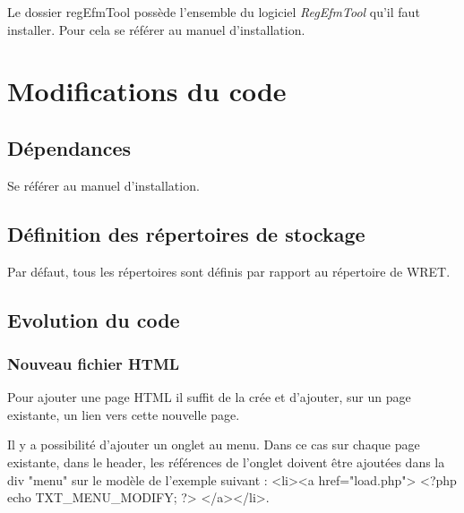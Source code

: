 \documentclass[12pt,a4paper]{report}
\begin{document}
Le dossier regEfmTool possède l'ensemble du logiciel \emph{RegEfmTool}
qu'il faut installer. Pour cela se référer au manuel d'installation.

\section{Modifications du code}
\subsection{Dépendances} 
Se référer au manuel d’installation.

\subsection{Définition des répertoires de stockage}

Par défaut, tous les répertoires sont définis par rapport au répertoire de WRET.


\subsection{Evolution du code}
\subsubsection{Nouveau fichier HTML}

Pour ajouter une page HTML il suffit de la crée et d'ajouter, sur un page existante, un lien vers cette nouvelle page.

Il y a possibilité d'ajouter un onglet au menu. Dans ce cas sur chaque page existante, dans le header, les références de l'onglet doivent \^etre ajoutées dans la div "menu" sur le modèle de l'exemple suivant : <li><a href="load.php">	<?php echo TXT_MENU_MODIFY; ?>	</a></li>.
\end{document}
